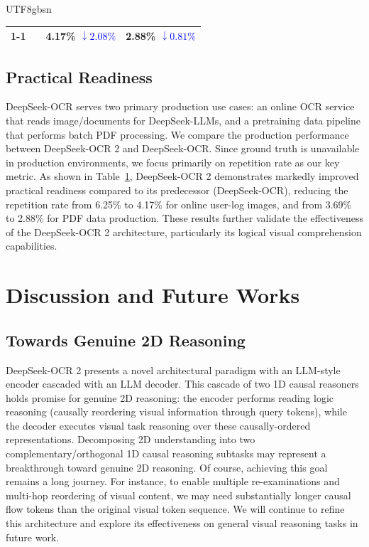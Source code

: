 \documentclass[11pt, a4paper, logo, copyright, nonumbering]{deepseek}
\begin{document}
\begin{CJK*}{UTF8}{gbsn}
\begin{table}[!t]
{\begin{tabular}{l|c|cc}
                \cmidrule{1-1}
                \cmidrule{3-4}
                 \multirow{1}{*}{DeepSeek-OCR 2}  & &4.17\% \textcolor{blue}{$\downarrow 2.08\%$}  & 2.88\% \textcolor{blue}{$\downarrow 0.81\%$}  \\

    \bottomrule
    \end{tabular}}


	\label{table4}
    \end{table}

\subsection{Practical Readiness }

DeepSeek-OCR serves two primary production use cases: an online OCR service that reads image/documents for DeepSeek-LLMs, and a pretraining data pipeline that performs batch PDF processing. We compare the production performance between DeepSeek-OCR 2 and DeepSeek-OCR. Since ground truth is unavailable in production environments, we focus primarily on repetition rate as our key metric. As shown in Table~\ref{table4}, DeepSeek-OCR 2 demonstrates markedly  improved practical readiness compared to its predecessor (DeepSeek-OCR), reducing the repetition rate from 6.25\% to 4.17\% for online user-log images, and from 3.69\% to 2.88\% for PDF data production. These results further validate the effectiveness of the DeepSeek-OCR 2 architecture, particularly its logical visual comprehension capabilities.





\section{Discussion and Future Works}
\subsection{Towards Genuine 2D Reasoning}
DeepSeek-OCR 2 presents a novel architectural paradigm with an LLM-style encoder cascaded with an LLM decoder. This cascade of two 1D causal reasoners holds promise for genuine 2D reasoning: the encoder performs reading logic reasoning (causally reordering visual information through query tokens), while the decoder executes visual task reasoning over these causally-ordered representations. Decomposing 2D understanding into two complementary/orthogonal 1D causal reasoning subtasks may represent a breakthrough toward genuine 2D reasoning. Of course, achieving this goal remains a long journey. For instance, to enable multiple re-examinations and multi-hop reordering  of visual content, we may need substantially longer causal flow tokens than the original visual token sequence. We will continue to refine this architecture and explore its effectiveness on general visual reasoning tasks in future work.


\end{CJK*}
\end{document}
